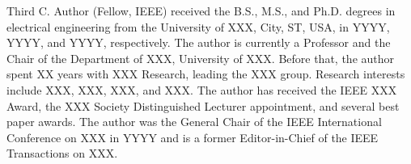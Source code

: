 \begin{IEEEbiography}{Third C. Author}
(Fellow, IEEE) received the B.S., M.S., and Ph.D. degrees in electrical engineering from the University of XXX, City, ST, USA, in YYYY, YYYY, and YYYY, respectively. The author is currently a Professor and the Chair of the Department of XXX, University of XXX. Before that, the author spent XX years with XXX Research, leading the XXX group. Research interests include XXX, XXX, XXX, and XXX. The author has received the IEEE XXX Award, the XXX Society Distinguished Lecturer appointment, and several best paper awards. The author was the General Chair of the IEEE International Conference on XXX in YYYY and is a former Editor-in-Chief of the IEEE Transactions on XXX.
\end{IEEEbiography}

\vfill
